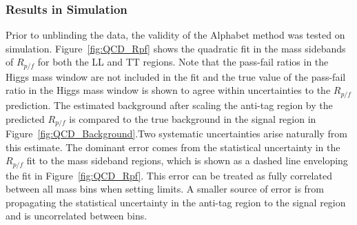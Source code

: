 



\subsubsection{Results in Simulation}

Prior to unblinding the data, the validity of the Alphabet method was tested on simulation. Figure~\ref{fig:QCD_Rpf} shows the quadratic fit in the mass sidebands of $R_{p/f}$ for both the LL and TT regions. Note that the pass-fail ratios in the Higgs mass window are not included in the fit and the true value of the pass-fail ratio in the Higgs mass window is shown to agree within uncertainties to the $R_{p/f}$ prediction. The estimated background after scaling the anti-tag region by the predicted $R_{p/f}$ is compared to the true background in the signal region in Figure~\ref{fig:QCD_Background}.Two systematic uncertainties arise naturally from this estimate. The dominant error comes from the statistical uncertainty in the $R_{p/f}$ fit to the mass sideband regions, which is shown as a dashed line enveloping the fit in Figure~\ref{fig:QCD_Rpf}. This error can be treated as fully correlated between all mass bins when setting limits. A smaller source of error is from propagating the statistical uncertainty in the anti-tag region to the signal region and is uncorrelated between bins.

